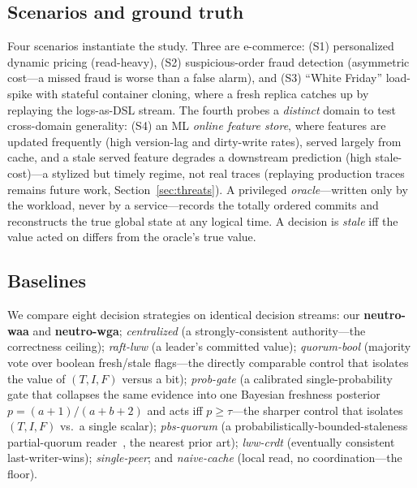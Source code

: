\documentclass[fleqn,10pt]{wlscirep}
\begin{document}
\subsection{Scenarios and ground truth}
Four scenarios instantiate the study. Three are e-commerce: (S1) personalized dynamic pricing
(read-heavy), (S2) suspicious-order fraud detection (asymmetric cost---a missed fraud is worse than a
false alarm), and (S3) ``White Friday'' load-spike with stateful container cloning, where a fresh replica
catches up by replaying the logs-as-DSL stream. The fourth probes a \emph{distinct} domain to test
cross-domain generality: (S4) an ML \emph{online feature store}, where features are updated frequently
(high version-lag and dirty-write rates), served largely from cache, and a stale served feature degrades
a downstream prediction (high stale-cost)---a stylized but timely regime, not real traces (replaying
production traces remains future work, Section~\ref{sec:threats}). A privileged \emph{oracle}---written
only by the workload, never by
a service---records the totally ordered commits and reconstructs the true global state at any logical
time. A decision is \emph{stale} iff the value acted on differs from the oracle's true value.

\subsection{Baselines}
We compare eight decision strategies on identical decision streams: our \textbf{neutro-waa} and
\textbf{neutro-wga}; \emph{centralized} (a strongly-consistent authority---the correctness ceiling);
\emph{raft-lww} (a leader's committed value); \emph{quorum-bool} (majority vote over boolean
fresh/stale flags---the directly comparable control that isolates the value of $(T,I,F)$ versus a bit);
\emph{prob-gate} (a calibrated single-probability gate that collapses the same evidence into one
Bayesian freshness posterior $p=(a{+}1)/(a{+}b{+}2)$ and acts iff $p\ge\tau$---the sharper control that
isolates $(T,I,F)$ vs.\ a single scalar); \emph{pbs-quorum} (a probabilistically-bounded-staleness
partial-quorum reader~\cite{bailis2012pbs}, the nearest prior art); \emph{lww-crdt} (eventually
consistent last-writer-wins); \emph{single-peer}; and \emph{naive-cache} (local read, no
coordination---the floor).
\end{document}
